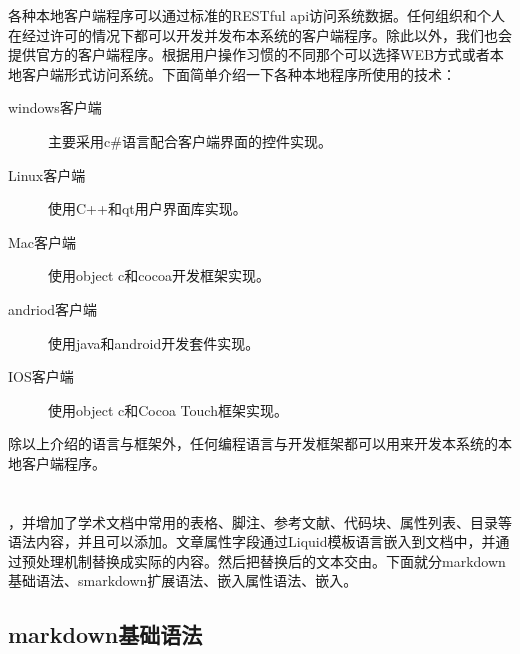 各种本地客户端程序可以通过标准的RESTful api访问系统数据。任何组织和个人在经过许可的情况下都可以开发并发布本系统的客户端程序。除此以外，我们也会提供官方的客户端程序。根据用户操作习惯的不同那个可以选择WEB方式或者本地客户端形式访问系统。下面简单介绍一下各种本地程序所使用的技术：
\begin{description}
\item[windows客户端] 主要采用c\#语言配合客户端界面的控件实现。
\item[Linux客户端] 使用C++和qt用户界面库实现。
\item[Mac客户端] 使用object c和cocoa开发框架实现。
\item[andriod客户端] 使用java和android开发套件实现。
\item[IOS客户端] 使用object c和Cocoa Touch框架实现。
\end{description}

除以上介绍的语言与框架外，任何编程语言与开发框架都可以用来开发本系统的本地客户端程序。

\section{}
\label{sec:smarkdownsyntax}

，并增加了学术文档中常用的表格、脚注、参考文献、代码块、属性列表、目录等语法内容，并且可以添加。文章属性字段通过Liquid模板语言嵌入到文档中，并通过预处理机制替换成实际的内容。然后把替换后的文本交由。下面就分markdown基础语法、smarkdown扩展语法、嵌入属性语法、嵌入。

\subsection{markdown基础语法}
\label{sec:markdownbase}

